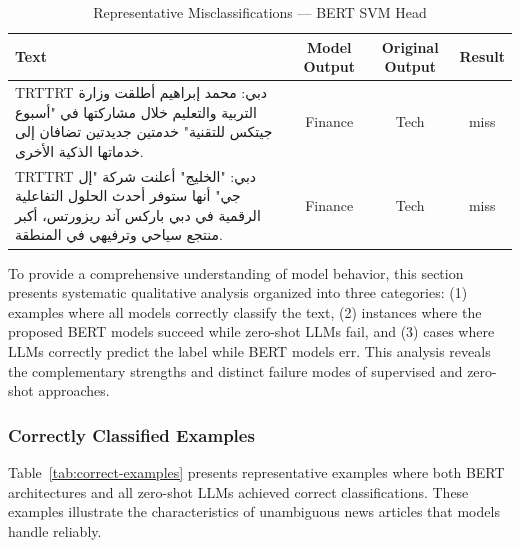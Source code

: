 \documentclass[preprint,12pt,authoryear]{elsarticle}
\newcommand{\RTL}[1]{%
  \bgroup
  \arabicfont
  \textdir TRT\pardir TRT
  #1%
  \egroup
}
\begin{document}
\begin{table}[h!]
    \centering
    \caption{Representative Misclassifications — BERT SVM Head}
    \label{tab:model-svm-evaluation}
    \begin{tabularx}{\textwidth}{>{\raggedleft\arraybackslash}X c c c}
        \toprule
        \textbf{Text} & \textbf{Model Output} & \textbf{Original Output} & \textbf{Result} \\
        \midrule
        \RTL{دبي: محمد إبراهيم أطلقت وزارة التربية والتعليم خلال مشاركتها في "أسبوع جيتكس للتقنية" خدمتين جديدتين تضافان إلى خدماتها الذكية الأخرى.} &
        Finance & Tech & miss \\
        \addlinespace
        \RTL{دبي: "الخليج" أعلنت شركة "إل جي" أنها ستوفر أحدث الحلول التفاعلية الرقمية في دبي باركس آند ريزورتس، أكبر منتجع سياحي وترفيهي في المنطقة.} &
        Finance & Tech & miss \\
        \bottomrule
    \end{tabularx}
\end{table}


To provide a comprehensive understanding of model behavior, this section presents systematic qualitative analysis organized into three categories: (1) examples where all models correctly classify the text, (2) instances where the proposed BERT models succeed while zero-shot LLMs fail, and (3) cases where LLMs correctly predict the label while BERT models err. This analysis reveals the complementary strengths and distinct failure modes of supervised and zero-shot approaches.

\subsubsection{Correctly Classified Examples}

Table~\ref{tab:correct-examples} presents representative examples where both BERT architectures and all zero-shot LLMs achieved correct classifications. These examples illustrate the characteristics of unambiguous news articles that models handle reliably.
\end{document}
